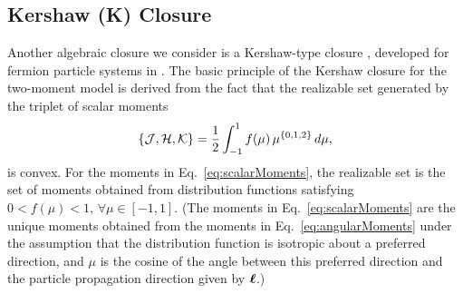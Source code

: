 \subsection{Kershaw (K) Closure}

Another algebraic closure we consider is a Kershaw-type closure \cite{kershaw_1976}, developed for fermion particle systems in \cite{banachLarecki_2017a}.  
The basic principle of the Kershaw closure for the two-moment model is derived from the fact that the realizable set generated by the triplet of scalar moments
\begin{equation}
  \{\mathcal{J},\mathcal{H},\mathcal{K}\}=\frac{1}{2}\int_{-1}^{1}f(\mu)\,\mu^{\{0,1,2\}}\,d\mu,
  \label{eq:scalarMoments}
\end{equation} 
is convex.  
For the moments in Eq.~\eqref{eq:scalarMoments}, the realizable set is the set of moments obtained from distribution functions satisfying $0<f(\mu)<1,\,\forall\mu\in[-1,1]$.  
(The moments in Eq.~\eqref{eq:scalarMoments} are the unique moments obtained from the moments in Eq.~\eqref{eq:angularMoments} under the assumption that the distribution function is isotropic about a preferred direction, and $\mu$ is the cosine of the angle between this preferred direction and the particle propagation direction given by $\boldsymbol{\ell}$.)  

